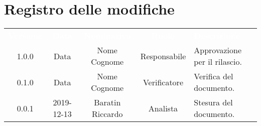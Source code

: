 \section*{Registro delle modifiche}
{
\renewcommand{\arraystretch}{1.5}
\centering
\begin{longtable}{ c c  c  c C{4cm}}
\textcolor{white}{\textbf{Versione}} & \textcolor{white}{\textbf{Data}} & \textcolor{white}{\textbf{Nominativo}} & \textcolor{white}{\textbf{Ruolo}} & \textcolor{white}{\textbf{Descrizione}}\\	


1.0.0 & Data & Nome Cognome & Responsabile & Approvazione per il rilascio.  \\
		
0.1.0 & Data & Nome Cognome & Verificatore & Verifica del documento.  \\
		
0.0.1 & 2019-12-13 & Baratin Riccardo & Analista & Stesura del documento.  \\
		
		
\end{longtable}
}